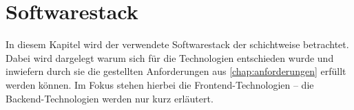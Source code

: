 \chapter{Softwarestack}
\label{chap:softwarestack}

In diesem Kapitel wird der verwendete Softwarestack der \shst{} schichtweise
betrachtet. Dabei wird dargelegt warum sich für die Technologien entschieden
wurde und inwiefern durch sie die gestellten Anforderungen aus \autoref{chap:anforderungen}
erfüllt werden können. Im Fokus stehen hierbei die Frontend-Technologien -- die
Backend-Technologien werden nur kurz erläutert.


